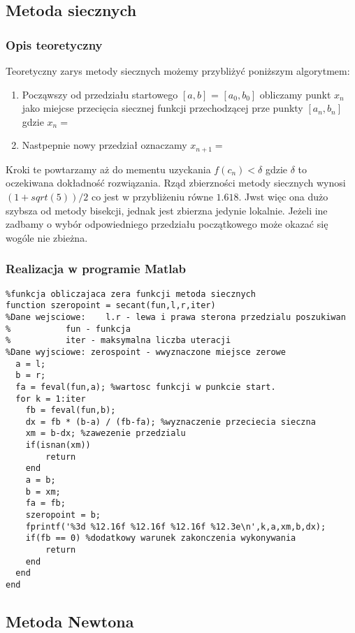 \documentclass[a4paper, 11pt]{article}
\begin{document}
\subsection{Metoda siecznych}
\subsubsection{Opis teoretyczny}
Teoretyczny zarys metody siecznych możemy przybliżyć poniższym algorytmem:
\begin{enumerate}
  \item Począwszy od przedziału startowego $[a,b]$ = $[a_{0},b_{0}]$ obliczamy punkt $x_{n}$ jako miejcse przecięcia siecznej funkcji przechodzącej prze punkty $[a_{n},b_{n}]$ gdzie $x_{n}=$
  \item Nastpepnie nowy przedział oznaczamy $x_{n+1}=$ 
\end{enumerate} 
Kroki te powtarzamy aż do mementu uzyckania $f(c_{n})<\delta$ gdzie $\delta$ to oczekiwana dokładność rozwiązania. Rząd zbierzności metody siecznych wynosi $(1+sqrt(5))/2$ co jest w przybliżeniu równe $1.618$. 
Jwst więc ona dużo szybsza od metody bisekcji, jednak jest zbierzna jedynie lokalnie. Jeżeli ine zadbamy o wybór odpowiedniego przedziału początkowego może okazać się wogóle nie zbieżna. 


\subsubsection{Realizacja w programie Matlab}
\begin{lstlisting}
%funkcja obliczajaca zera funkcji metoda siecznych
function szeropoint = secant(fun,l,r,iter)
%Dane wejsciowe:	l.r - lewa i prawa sterona przedzialu poszukiwan
%			fun - funkcja 
%			iter - maksymalna liczba uteracji
%Dane wyjsciowe: zerospoint - wwyznaczone miejsce zerowe
  a = l;
  b = r;
  fa = feval(fun,a); %wartosc funkcji w punkcie start.
  for k = 1:iter
    fb = feval(fun,b);
    dx = fb * (b-a) / (fb-fa); %wyznaczenie przeciecia sieczna
    xm = b-dx; %zawezenie przedzialu
    if(isnan(xm))
        return
    end
    a = b;
    b = xm;
    fa = fb;
    szeropoint = b;
    fprintf('%3d %12.16f %12.16f %12.16f %12.3e\n',k,a,xm,b,dx);
    if(fb == 0) %dodatkowy warunek zakonczenia wykonywania
        return
    end
  end
end
\end{lstlisting}

\subsection{Metoda Newtona}
\end{document}
